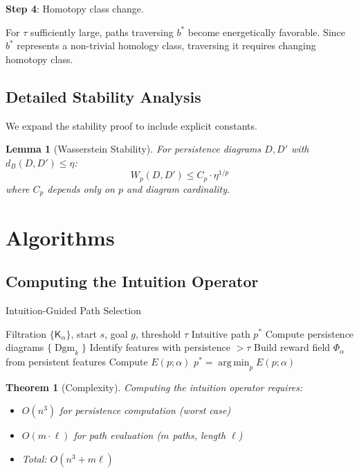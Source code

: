 \documentclass[11pt]{article}
\newtheorem{theorem}{Theorem}[section]
\newtheorem{lemma}{Lemma}[section]
\DeclareMathOperator{\Dgm}{Dgm}
\DeclareMathOperator*{\argmin}{arg\,min}
\begin{document}
\textbf{Step 4}: Homotopy class change.

For $\tau$ sufficiently large, paths traversing $b^*$ become energetically favorable. Since $b^*$ represents a non-trivial homology class, traversing it requires changing homotopy class.

\subsection{Detailed Stability Analysis}

We expand the stability proof to include explicit constants.

\begin{lemma}[Wasserstein Stability]
For persistence diagrams $D, D'$ with $d_B(D, D') \leq \eta$:
$$W_p(D, D') \leq C_p \cdot \eta^{1/p}$$
where $C_p$ depends only on $p$ and diagram cardinality.
\end{lemma}

\section{Algorithms}

\subsection{Computing the Intuition Operator}

\begin{algorithm}
\caption{Intuition-Guided Path Selection}
\begin{algorithmic}[1]
\REQUIRE Filtration $\{\mathsf{K}_\alpha\}$, start $s$, goal $g$, threshold $\tau$
\ENSURE Intuitive path $p^*$
\STATE Compute persistence diagrams $\{\Dgm_k\}$
\STATE Identify features with persistence $> \tau$
\STATE Build reward field $\Phi_\alpha$ from persistent features
    \STATE Compute $E(p; \alpha)$
\ENDFOR
\RETURN $p^* = \argmin_p E(p; \alpha)$
\end{algorithmic}
\end{algorithm}

\begin{theorem}[Complexity]
Computing the intuition operator requires:
\begin{itemize}
    \item $O(n^3)$ for persistence computation (worst case)
    \item $O(m \cdot \ell)$ for path evaluation ($m$ paths, length $\ell$)
    \item Total: $O(n^3 + m\ell)$
\end{itemize}
\end{theorem}
\end{document}

